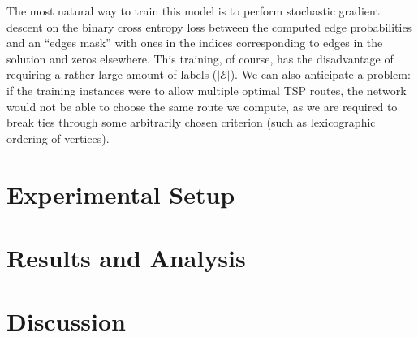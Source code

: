 \documentclass{article}
\begin{document}
The most natural way to train this model is to perform stochastic gradient descent on the binary cross entropy loss between the computed edge probabilities and an ``edges mask'' with ones in the indices corresponding to edges in the solution and zeros elsewhere. This training, of course, has the disadvantage of requiring a rather large amount of labels ($|\mathcal{E}|$). We can also anticipate a problem: if the training instances were to allow multiple optimal TSP routes, the network would not be able to choose the same route we compute, as we are required to break ties through some arbitrarily chosen criterion (such as lexicographic ordering of vertices).

\section{Experimental Setup}

\section{Results and Analysis}

\section{Discussion}



\end{document}
